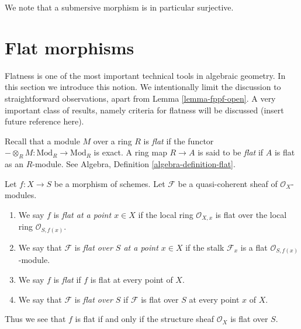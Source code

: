 \noindent
We note that a submersive morphism is in particular surjective.









\section{Flat morphisms}
\label{section-flat}

\noindent
Flatness is one of the most important technical tools in algebraic geometry.
In this section we introduce this notion. We intentionally limit the discussion
to straightforward observations, apart from Lemma \ref{lemma-fppf-open}.
A very important class of results, namely criteria for flatness will
be discussed (insert future reference here).

\medskip\noindent
Recall that a module $M$ over a ring $R$ is {\it flat} if the functor
$-\otimes_R M : \text{Mod}_R \to \text{Mod}_R$ is exact. A ring map
$R \to A$ is said to be {\it flat} if $A$ is flat as an $R$-module.
See
Algebra, Definition \ref{algebra-definition-flat}.

\begin{definition}
\label{definition-flat}
Let $f : X \to S$ be a morphism of schemes.
Let $\mathcal{F}$ be a quasi-coherent sheaf of $\mathcal{O}_X$-modules.
\begin{enumerate}
\item We say $f$ is {\it flat at a point $x \in X$} if the
local ring $\mathcal{O}_{X, x}$ is flat over the local ring
$\mathcal{O}_{S, f(x)}$.
\item We say that $\mathcal{F}$ is {\it flat over $S$ at a point $x \in X$}
if the stalk $\mathcal{F}_x$ is a flat $\mathcal{O}_{S, f(x)}$-module.
\item We say $f$ is {\it flat} if $f$ is flat at every point of $X$.
\item We say that $\mathcal{F}$ is {\it flat over $S$} if
$\mathcal{F}$ is flat over $S$ at every point $x$ of $X$.
\end{enumerate}
\end{definition}

\noindent
Thus we see that $f$ is flat if and only if
the structure sheaf $\mathcal{O}_X$ is flat over $S$.

